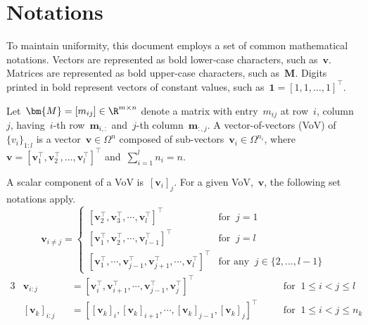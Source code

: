 \section{Notations}\label{sec:notations}

To maintain uniformity, this document employs a set of common mathematical notations. Vectors are represented as bold lower-case characters, such as~\(\bm{v}\). Matrices are represented as bold upper-case characters, such as~\(\bm{M}\). Digits printed in bold represent vectors of constant values, such as~\(\bm{1}={[1, 1, \ldots, 1]}^\top\).

Let~\(\bm{M} = [m_{ij}] \in \R^{m\times n}\) denote a matrix with entry~\(m_{ij}\) at row~\(i\), column~\(j\), having~\(i\)-th row~\(\bm{m}_{i,:}\) and~\(j\)-th column~\(\bm{m}_{:,j}\). A vector-of-vectors (VoV) of~\({\{v_{i}\}}_{1:l}\) is a vector~\(\bm{v}\in\Omega^n\) composed of sub-vectors~\(\bm{v}_i\in\Omega^{n_i}\), where~\(\bm{v}={[\bm{v}_1^\top, \bm{v}_2^\top, \ldots, \bm{v}_l^\top]}^\top\) and~\(\sum_{i=1}^l n_i = n\).

A scalar component of a VoV is~\({[\bm{v}_i]}_j\). For a given VoV,~\(\bm{v}\), the following set notations apply.
\begin{equation*}
  \bm{v}_{i\neq j} =
  \begin{cases}
    {\left[
        \bm{v}_2^\top,
        \bm{v}_3^\top,
        \cdots,
        \bm{v}_l^\top
    \right]}^\top & \text{for }\ j = 1\\
    {\left[
        \bm{v}_1^\top,
        \bm{v}_2^\top,
        \cdots,
        \bm{v}_{l-1}^\top
    \right]}^\top & \text{for }\ j = l\\
    {\left[
        \bm{v}_1^\top,
        \cdots,
        \bm{v}_{j-1}^\top,
        \bm{v}_{j+1}^\top,
        \cdots,
        \bm{v}_l^\top
    \right]}^\top & \text{for any }\ j\in\{2,\ldots,l-1\}
  \end{cases}
\end{equation*}
\begin{alignat*}{3}
  &\bm{v}_{i:j} &&= {\left[
      \bm{v}_i^\top,
      \bm{v}_{i+1}^\top,
      \cdots,
      \bm{v}_{j-1}^\top,
      \bm{v}_j^\top
  \right]}^\top\quad &&\text{for }\ 1\leq i<j \leq l\\
  &{\left[\bm{v}_k\right]}_{i:j} &&= {\left[
      {\left[\bm{v}_k\right]}_i,
      {\left[\bm{v}_k\right]}_{i+1},
      \cdots,
      {\left[\bm{v}_k\right]}_{j-1},
      {\left[\bm{v}_k\right]}_j
  \right]}^\top\quad &&\text{for }\ 1\leq i<j \leq n_k
\end{alignat*}

